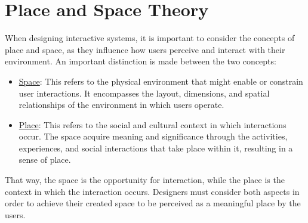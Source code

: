 \section{Place and Space Theory}

When designing interactive systems, it is important to consider the concepts of place and space, as they influence how users perceive and interact with their environment. An important distinction is made between the two concepts:
\begin{itemize}
    \item \ul{Space}: This refers to the physical environment that might enable or constrain user interactions. It encompasses the layout, dimensions, and spatial relationships of the environment in which users operate.
    \item \ul{Place}: This refers to the social and cultural context in which interactions occur. The space acquire meaning and significance through the activities, experiences, and social interactions that take place within it, resulting in a sense of place.
\end{itemize}

That way, the space is the opportunity for interaction, while the place is the context in which the interaction occurs. Designers must consider both aspects in order to achieve their created space to be perceived as a meaningful place by the users.
